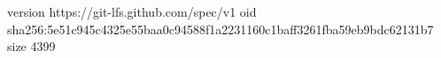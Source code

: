 version https://git-lfs.github.com/spec/v1
oid sha256:5e51c945c4325e55baa0c94588f1a2231160c1baff3261fba59eb9bdc62131b7
size 4399
